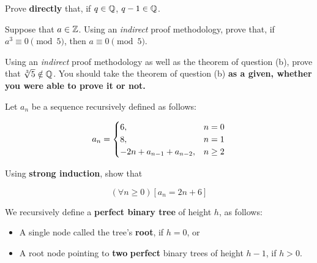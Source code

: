 \documentclass[letterpaper,12pt]{article}
\begin{document}
\notespage



Prove {\bf directly} that, if $q \in \mathbb{Q}$, $q-1 \in \mathbb{Q}$.

\vspace{-.3in} 



Suppose that $a \in \mathbb{Z}$. Using an {\em indirect} proof methodology, prove that, if $a^3 \equiv 0 \pmod{5}$, then $a \equiv 0 \pmod{5}$. \vspace{-.3in}



Using an {\em indirect} proof methodology as well as the theorem of question (b), prove that $\sqrt[3]{5} \notin \mathbb{Q}$. You should take the theorem of question (b) {\bf as a given, whether you were able to prove it or not.} \vspace{-.3in}


\notespage





Let $a_n$ be a sequence recursively defined as follows:


{\Large $$a_n = \begin{cases}6, & n = 0 \\ 8, & n = 1 \\ -2n + a_{\tiny n-1} + a_{\tiny n-2}, & n \geq 2 \end{cases}$$ }

Using {\bf strong induction}, show that 

{\Large $$(\forall n\ge 0)[a_n = 2n+6]$$ }

\vspace{-.2in}
\standardinductionspace

\pagebreak


We recursively define a {\bf perfect binary tree} of height $h$, as follows:

\begin{itemize}
	\item A single node called the tree's \textbf{root}, if $h=0$, or 
	\item A root node pointing to \textbf{two} \textbf{perfect} binary trees of height $h-1$, if $h>0$.
\end{itemize}
\end{document}
